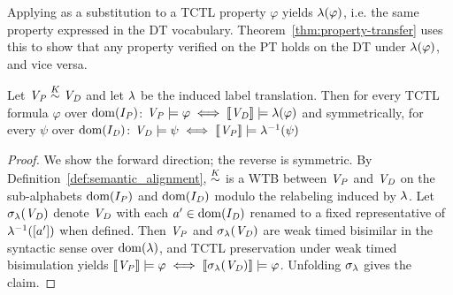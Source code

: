 %


Applying
\LabelMapping as a substitution to a TCTL property $\varphi$ yields $\lambda(\varphi)$, i.e.  the same property expressed in the DT vocabulary. Theorem~\ref{thm:property-transfer} uses this to show that any property verified on the PT holds on the DT under $\lambda(\varphi)$, and vice versa.

\begin{theorem}
\label{thm:property-transfer}
Let $\mathit{V_P} \stackrel{K}{\sim} \mathit{V_D}$ and let $\lambda$ be the induced label translation. Then for every TCTL formula $\varphi$ over $\mathrm{dom}(I_{\mathit{P}})$:
$\mathit{V_P} \models \varphi \iff \llbracket \mathit{V_D} \rrbracket \models \lambda(\varphi)$
and symmetrically, for every $\psi$ over $\mathrm{dom}(I_{\mathit{D}})$:
$\mathit{V_D} \models \psi \iff \llbracket \mathit{V_P} \rrbracket\models \lambda^{-1}(\psi)$
\end{theorem}

\begin{proof}
We show the forward direction; the reverse is symmetric. By
Definition~\ref{def:semantic_alignment}, $\stackrel{K}{\sim}$ is a WTB between $\mathit{V_P}$ and $\mathit{V_D}$ on the sub-alphabets $\mathrm{dom}(I_{\mathit{P}})$ and
$\mathrm{dom}(I_{\mathit{D}})$ modulo the relabeling induced by $\lambda$. Let $\sigma_\lambda(\mathit{V_D})$
denote $\mathit{V_D}$ with each $a' \in \mathrm{dom}(I_{\mathit{D}})$ renamed to a fixed representative
of $\lambda^{-1}([a'])$ when defined. Then $\mathit{V_P}$ and $\sigma_\lambda(\mathit{V_D})$
are weak timed bisimilar in the syntactic sense over
$\mathrm{dom}(\lambda)$, and TCTL preservation under weak timed
bisimulation yields
$\llbracket \mathit{V_P} \rrbracket \models \varphi \iff
\llbracket \sigma_\lambda(\mathit{V_D}) \rrbracket \models \varphi$. Unfolding
$\sigma_\lambda$ gives the claim.
\end{proof}



